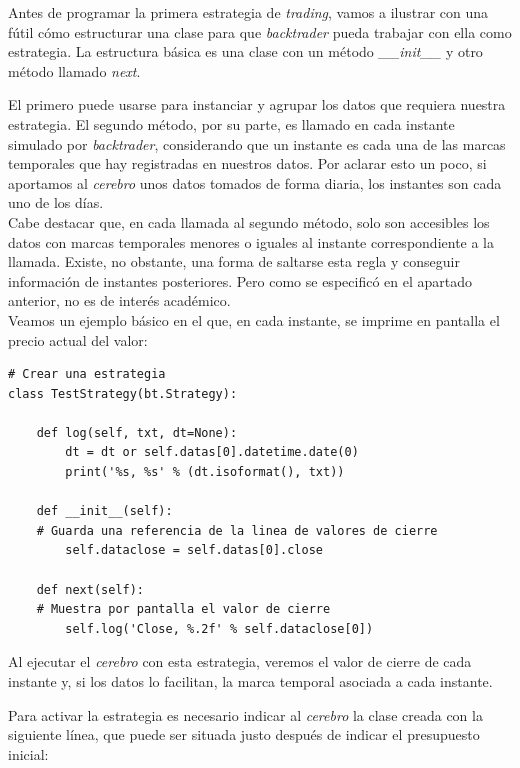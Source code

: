 		Antes de programar la primera estrategia de \textit{trading}, vamos a ilustrar con una f\'util c\'omo estructurar una clase para que \textit{backtrader} pueda trabajar con ella como estrategia. La estructura b\'asica es una clase con un m\'etodo \textit{\_\_init\_\_} y otro m\'etodo llamado \textit{next}. 
		
		El primero puede usarse para instanciar y agrupar los datos que requiera nuestra estrategia. El segundo m\'etodo, por su parte, es llamado en cada instante simulado por \textit{backtrader}, considerando que un instante es cada una de las marcas temporales que hay registradas en nuestros datos. Por aclarar esto un poco, si aportamos al \textit{cerebro} unos datos tomados de forma diaria, los instantes son cada uno de los d\'ias. \\
		
		Cabe destacar que, en cada llamada al segundo m\'etodo, solo son accesibles los datos con marcas temporales menores o iguales al instante correspondiente a la llamada. Existe, no obstante, una forma de saltarse esta regla y conseguir informaci\'on de instantes posteriores. Pero como se especific\'o en el apartado anterior, no es de inter\'es acad\'emico.\\
		
		Veamos un ejemplo b\'asico en el que, en cada instante, se imprime en pantalla el precio actual del valor:
		
		\begin{lstlisting}[basicstyle=\tiny]
# Crear una estrategia
class TestStrategy(bt.Strategy):

	def log(self, txt, dt=None):
		dt = dt or self.datas[0].datetime.date(0)
		print('%s, %s' % (dt.isoformat(), txt))
	
	def __init__(self):
	# Guarda una referencia de la linea de valores de cierre
		self.dataclose = self.datas[0].close
	
	def next(self):
	# Muestra por pantalla el valor de cierre
		self.log('Close, %.2f' % self.dataclose[0])
		\end{lstlisting}
		
		Al ejecutar el \textit{cerebro} con esta estrategia, veremos el valor de cierre de cada instante y, si los datos lo facilitan, la marca temporal asociada a cada instante.
		
		Para activar la estrategia es necesario indicar al \textit{cerebro} la clase creada con la siguiente l\'inea, que puede ser situada justo despu\'es de indicar el presupuesto inicial:

